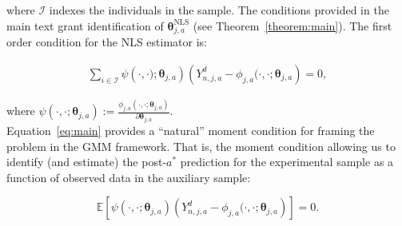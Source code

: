 \noindent where $\mathcal{I}$ indexes the individuals in the sample. The conditions provided in the main text grant identification of  $\bm{\theta}_{j,a}^{\text{NLS}}$ (see Theorem~\ref{theorem:main}). The first order condition for the NLS estimator is: 

\begin{eqnarray} 
\sum \limits _{i \in \mathcal{I}}  \psi \left( \cdot , \cdot); \bm{\theta}_{j,a} \right) \left( Y^d_{n,j,a}  - \phi_{j,a} (\cdot , \cdot; \bm{\theta}_{j,a} \right) = 0, \label{eq:nlsfoc}
\end{eqnarray}

\noindent where $\psi \left( \cdot , \cdot; \bm{\theta}_{j,a} \right) := \frac{ \phi_{j,a} \left( \cdot , \cdot; \bm{\theta}_{j,a} \right)}{\partial \bm{\theta}_{j,a}}$.\\

\noindent Equation~\eqref{eq:main} provides a ``natural'' moment condition for framing the problem in the GMM framework. That is, the moment condition allowing us to identify (and estimate) the post-$a^*$ prediction for the experimental sample as a function of observed data in the auxiliary sample: 

\begin{equation}
\mathbb{E} \left[\psi \left( \cdot , \cdot; \bm{\theta}_{j,a} \right) \left( Y^d_{n,j,a}  - \phi_{j,a} (\cdot , \cdot; \bm{\theta}_{j,a} \right) \right]  = 0.
\end{equation}



\pagebreak
\singlespace






